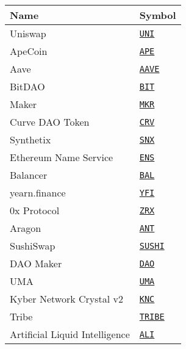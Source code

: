 \begin{tabular}{ll}
\toprule
Name & Symbol \\
\midrule
Uniswap & \href{https://etherscan.io/address/0x1f9840a85d5af5bf1d1762f925bdaddc4201f984}{\tt UNI} \\
ApeCoin & \href{https://etherscan.io/address/0x4d224452801aced8b2f0aebe155379bb5d594381}{\tt APE} \\
Aave & \href{https://etherscan.io/address/0x7Fc66500c84A76Ad7e9c93437bFc5Ac33E2DDaE9}{\tt AAVE} \\
BitDAO & \href{https://etherscan.io/address/0x1A4b46696b2bB4794Eb3D4c26f1c55F9170fa4C5}{\tt BIT} \\
Maker & \href{https://etherscan.io/address/0x9f8f72aa9304c8b593d555f12ef6589cc3a579a2}{\tt MKR} \\
Curve DAO Token & \href{https://etherscan.io/address/0xD533a949740bb3306d119CC777fa900bA034cd52}{\tt CRV} \\
Synthetix & \href{https://etherscan.io/address/0xc011a73ee8576fb46f5e1c5751ca3b9fe0af2a6f}{\tt SNX} \\
Ethereum Name Service & \href{https://etherscan.io/address/0xC18360217D8F7Ab5e7c516566761Ea12Ce7F9D72}{\tt ENS} \\
Balancer & \href{https://etherscan.io/address/0xba100000625a3754423978a60c9317c58a424e3D}{\tt BAL} \\
yearn.finance & \href{https://etherscan.io/address/0x0bc529c00c6401aef6d220be8c6ea1667f6ad93e}{\tt YFI} \\
0x Protocol & \href{https://etherscan.io/address/0xe41d2489571d322189246dafa5ebde1f4699f498}{\tt ZRX} \\
Aragon & \href{https://etherscan.io/address/0xa117000000f279d81a1d3cc75430faa017fa5a2e}{\tt ANT} \\
SushiSwap & \href{https://etherscan.io/address/0x6b3595068778dd592e39a122f4f5a5cf09c90fe2}{\tt SUSHI} \\
DAO Maker & \href{https://etherscan.io/address/0x0f51bb10119727a7e5ea3538074fb341f56b09ad}{\tt DAO} \\
UMA & \href{https://etherscan.io/address/0x04Fa0d235C4abf4BcF4787aF4CF447DE572eF828}{\tt UMA} \\
Kyber Network Crystal v2 & \href{https://etherscan.io/address/0xdeFA4e8a7bcBA345F687a2f1456F5Edd9CE97202}{\tt KNC} \\
Tribe & \href{https://etherscan.io/address/0xc7283b66Eb1EB5FB86327f08e1B5816b0720212B}{\tt TRIBE} \\
Artificial Liquid Intelligence & \href{https://etherscan.io/address/0x6b0b3a982b4634ac68dd83a4dbf02311ce324181}{\tt ALI} \\

\end{tabular}
